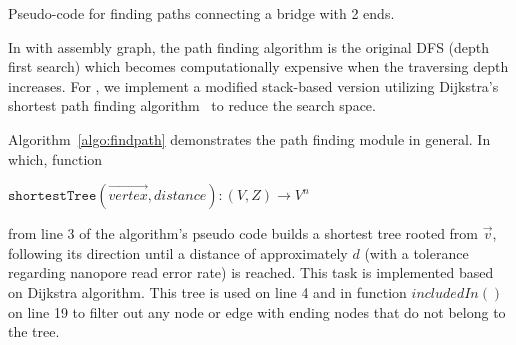 \begin{algorithm}[!hpt]
\DontPrintSemicolon
{}
\caption{Pseudo-code for finding paths connecting a bridge with 2 ends.}
\label{algo:findpath}
\end{algorithm}
In \npscarf{} with assembly graph, the path finding algorithm is the original DFS (depth first search) which becomes computationally expensive when the traversing depth increases. For \npgraph{}, we implement a modified stack-based version utilizing Dijkstra's shortest path finding algorithm~\cite{Dijkstra1959} to reduce the search space.

Algorithm~\ref{algo:findpath} demonstrates the path finding module in general.
In which, function 

$\mathtt{shortestTree}(\overrightarrow{vertex},distance) : (V,Z) \rightarrow V^n$ 

from line 3 of the algorithm's pseudo code builds a shortest tree rooted from $\overrightarrow{v}$, following its direction until a distance of approximately $d$ (with a tolerance regarding nanopore read error rate) is reached. This task is implemented based on Dijkstra algorithm.
This tree is used on line 4 and in function $includedIn()$ on line 19 to filter out any node or edge with ending nodes that do not belong to the tree.

